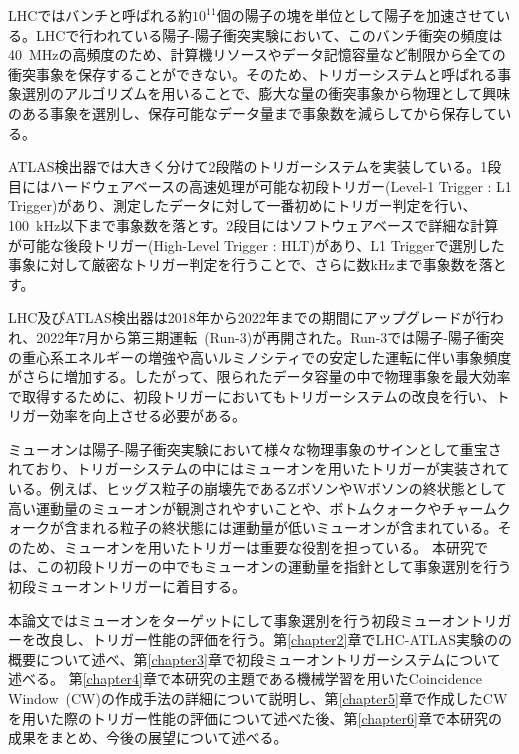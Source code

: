 LHCではバンチと呼ばれる約$10^{11}$個の陽子の塊を単位として陽子を加速させている。LHCで行われている陽子-陽子衝突実験において、このバンチ衝突の頻度は40~MHzの高頻度のため、計算機リソースやデータ記憶容量など制限から全ての衝突事象を保存することができない。そのため、トリガーシステムと呼ばれる事象選別のアルゴリズムを用いることで、膨大な量の衝突事象から物理として興味のある事象を選別し、保存可能なデータ量まで事象数を減らしてから保存している。

ATLAS検出器では大きく分けて2段階のトリガーシステムを実装している。1段目にはハードウェアベースの高速処理が可能な初段トリガー(Level-1 Trigger : L1 Trigger)があり、測定したデータに対して一番初めにトリガー判定を行い、100~kHz以下まで事象数を落とす。2段目にはソフトウェアベースで詳細な計算が可能な後段トリガー(High-Level Trigger : HLT)があり、L1 Triggerで選別した事象に対して厳密なトリガー判定を行うことで、さらに数kHzまで事象数を落とす。

LHC及びATLAS検出器は2018年から2022年までの期間にアップグレードが行われ、2022年7月から第三期運転~(Run-3)が再開された。Run-3では陽子-陽子衝突の重心系エネルギーの増強や高いルミノシティでの安定した運転に伴い事象頻度がさらに増加する。したがって、限られたデータ容量の中で物理事象を最大効率で取得するために、初段トリガーにおいてもトリガーシステムの改良を行い、トリガー効率を向上させる必要がある\cite{article:phase-1}。

ミューオンは陽子-陽子衝突実験において様々な物理事象のサインとして重宝されており、トリガーシステムの中にはミューオンを用いたトリガーが実装されている。例えば、ヒッグス粒子の崩壊先であるZボソンやWボソンの終状態として高い運動量のミューオンが観測されやすいことや、ボトムクォークやチャームクォークが含まれる粒子の終状態には運動量が低いミューオンが含まれている。そのため、ミューオンを用いたトリガーは重要な役割を担っている。
本研究では、この初段トリガーの中でもミューオンの運動量を指針として事象選別を行う初段ミューオントリガーに着目する。

本論文ではミューオンをターゲットにして事象選別を行う初段ミューオントリガーを改良し、トリガー性能の評価を行う。第\ref{chapter2}章でLHC-ATLAS実験のの概要について述べ、第\ref{chapter3}章で初段ミューオントリガーシステムについて述べる。
第\ref{chapter4}章で本研究の主題である機械学習を用いたCoincidence Window~(CW)の作成手法の詳細について説明し、第\ref{chapter5}章で作成したCWを用いた際のトリガー性能の評価について述べた後、第\ref{chapter6}章で本研究の成果をまとめ、今後の展望について述べる。


